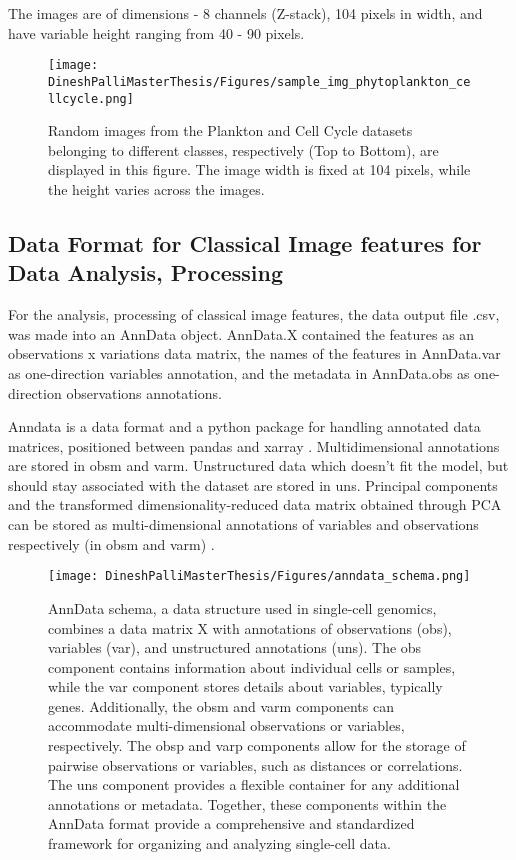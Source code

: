 \documentclass[12pt,a4paper]{article}
\begin{document}
The images are of dimensions - 8 channels (Z-stack), 104 pixels in width, and have variable height ranging from 40 - 90 pixels.

\begin{figure}
  \centering
  \texttt{[image: DineshPalliMasterThesis/Figures/sample\_img\_phytoplankton\_cellcycle.png]}
  \caption[Images from Plankton and Cell Cycle datasets from multiple classes]{Random images from the Plankton and Cell Cycle datasets belonging to different classes, respectively (Top to Bottom), are displayed in this figure. The image width is fixed at 104 pixels, while the height varies across the images.}
  \label{sampleimgs}
\end{figure}

\subsection{Data Format for Classical Image features for Data Analysis, Processing}
\label{adata_scanpy}
For the analysis, processing of classical image features, the data output file .csv, was made into an AnnData object. AnnData.X contained the features as an observations x variations data matrix, the names of the features in AnnData.var as one-direction variables annotation, and the metadata in AnnData.obs as one-direction observations annotations.

Anndata is a data format and a python package for handling annotated data matrices, positioned between pandas and xarray \cite{virshup_rybakov_theis_angerer_wolf_2021}. Multidimensional annotations are stored in obsm and varm. Unstructured data which doesn’t fit the model, but should stay associated with the dataset are stored in uns. Principal components and the transformed dimensionality-reduced data matrix obtained through PCA can be stored as multi-dimensional annotations of variables and observations respectively (in obsm and varm) \cite{virshup_rybakov_theis_angerer_wolf_2021}.

\begin{figure}
  \centering
  \texttt{[image: DineshPalliMasterThesis/Figures/anndata\_schema.png]}
  \caption[AnnData Schema]{AnnData schema, a data structure used in single-cell genomics, combines a data matrix X with annotations of observations (obs), variables (var), and unstructured annotations (uns). The obs component contains information about individual cells or samples, while the var component stores details about variables, typically genes. Additionally, the obsm and varm components can accommodate multi-dimensional observations or variables, respectively. The obsp and varp components allow for the storage of pairwise observations or variables, such as distances or correlations. The uns component provides a flexible container for any additional annotations or metadata. Together, these components within the AnnData format provide a comprehensive and standardized framework for organizing and analyzing single-cell data.}
  \label{adata}
\end{figure}
\end{document}
